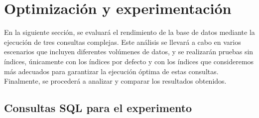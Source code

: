 \section{Optimización y experimentación}
En la siguiente sección, se evaluará el rendimiento de la base de datos mediante la ejecución de tres consultas complejas. Este análisis se llevará a cabo en varios escenarios que incluyen diferentes volúmenes de datos, y se realizarán pruebas sin índices, únicamente con los índices por defecto y con los índices que consideremos más adecuados para garantizar la ejecución óptima de estas consultas. Finalmente, se procederá a analizar y comparar los resultados obtenidos.
\subsection{Consultas SQL para el experimento}
